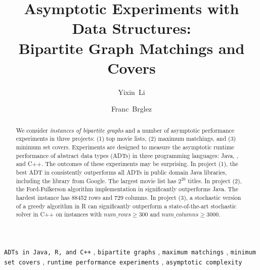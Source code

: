 \begin{frontmatter}

\title{
Asymptotic Experiments with Data Structures:\\ 
Bipartite Graph Matchings and Covers
}


\author{Yixin~Li}{
\author{Franc~Brglez}
}
\address{
Computer Science, NC State University, Raleigh, NC 27695, USA\\
\url{https://people.engr.ncsu.edu/brglez/} 
}
\begin{abstract}
We consider {\em instances of bipartite  graphs}  and a number of asymptotic performance experiments in three projects: 
(1) top movie lists, %
(2) maximum matchings, and 
(3) minimum set covers.
Experiments are designed to measure the asymptotic runtime performance of abstract data types (ADTs) in three programming languages: Java, \R{}, and C++.
%
The outcomes of these experiments may be surprising.
%
In project (1), the best ADT in \R{} consistently outperforms all ADTs in public domain Java libraries, including the library from Google. 
The largest movie list has $2^{20}$ titles.
%
In project (2), the Ford-Fulkerson algorithm implementation in \R{} significantly outperforms Java.
The hardest instance has 88452 rows and 729 columns.
%
In project (3),  
a stochastic version of a greedy algorithm 
in R can significantly outperform a state-of-the-art stochastic
solver in C++ on instances with 
$num\_rows \ge 300$ and $num\_columns \ge 3000$. 
\end{abstract}
%
\begin{keyword}
\texttt{ADTs in Java, R, and C++}        \sep 
\texttt{bipartite graphs}                \sep 
\texttt{maximum matchings}               \sep 
\texttt{minimum set covers}              \sep 
\texttt{runtime performance experiments} \sep
\texttt{asymptotic complexity}   
\end{keyword}

\end{frontmatter}